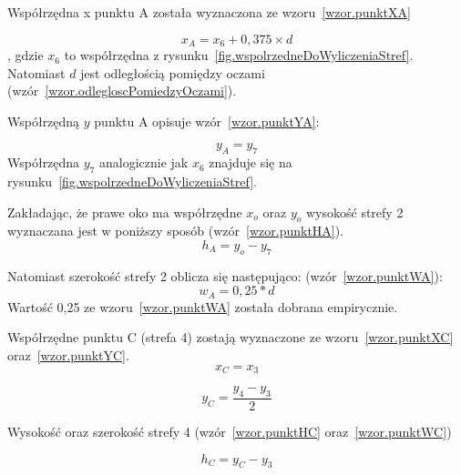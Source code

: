 \documentclass[a4paper,twoside,12pt]{book}
\begin{document}
    Współrzędna x punktu A została wyznaczona ze wzoru~\ref{wzor.punktXA}

    \large
    \begin{equation}
        x_{A}=x_{6} + 0,375 \times d
        \label{wzor.punktXA}
    \end{equation}
    \normalsize
    , gdzie $x_{6}$ to współrzędna z rysunku~\ref{fig.wspolrzedneDoWyliczeniaStref}.
    Natomiast $d$ jest odległością pomiędzy oczami (wzór~\ref{wzor.odlegloscPomiedzyOczami}).

    Współrzędną $y$ punktu A opisuje wzór~\ref{wzor.punktYA}:

    \large
    \begin{equation}
        y_{A}=y_{7}
        \label{wzor.punktYA}
    \end{equation}
    \normalsize
    Współrzędna $y_{7}$ analogicznie jak $x_{6}$ znajduje się na rysunku~\ref{fig.wspolrzedneDoWyliczeniaStref}.

    Zakładając, że prawe oko ma współrzędne $x_{o}$ oraz  $y_{o}$ wysokość strefy 2 wyznaczana jest w poniższy sposób
    (wzór~\ref{wzor.punktHA}).
    \large
    \begin{equation}
        h_{A}=y_{o}-y_{7}
        \label{wzor.punktHA}
    \end{equation}
    \normalsize

    Natomiast szerokość strefy 2 oblicza się następująco: (wzór~\ref{wzor.punktWA}):
    \large
    \begin{equation}
        w_{A}=0,25 * d
        \label{wzor.punktWA}
    \end{equation}
    \normalsize
    Wartość 0,25 ze wzoru~\ref{wzor.punktWA} została dobrana empirycznie.

    Współrzędne punktu C (strefa 4) zostają wyznaczone ze wzoru~\ref{wzor.punktXC} oraz~\ref{wzor.punktYC}.
    \large
    \begin{equation}
        x_{C}=x_{3}
        \label{wzor.punktXC}
    \end{equation}
    \normalsize

    \large
    \begin{equation}
        y_{C}= \frac{y_{4} - y_{3}}{2}
        \label{wzor.punktYC}
    \end{equation}
    \normalsize

    Wysokość oraz szerokość strefy 4 (wzór~\ref{wzor.punktHC} oraz~\ref{wzor.punktWC})

    \large
    \begin{equation}
        h_{C}=y_{C} - y_{3}
        \label{wzor.punktHC}
    \end{equation}
    \normalsize
\end{document}
